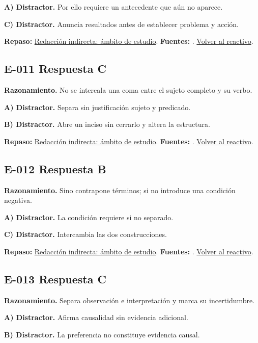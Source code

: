 \textbf{A) Distractor. }Por ello requiere un antecedente que aún no aparece.

\textbf{C) Distractor. }Anuncia resultados antes de establecer problema y acción.

\textbf{Repaso:} \hyperref[sec:e1]{Redacción indirecta: ámbito de estudio}. \textbf{Fuentes:} \cite{rae,writing}. \hyperref[q:E-010]{Volver al reactivo}.\par\medskip

\subsection*{E-011 \quad Respuesta C}\label{s:E-011}
\textbf{Razonamiento.} No se intercala una coma entre el sujeto completo y su verbo.

\textbf{A) Distractor. }Separa sin justificación sujeto y predicado.

\textbf{B) Distractor. }Abre un inciso sin cerrarlo y altera la estructura.

\textbf{Repaso:} \hyperref[sec:e1]{Redacción indirecta: ámbito de estudio}. \textbf{Fuentes:} \cite{rae,writing}. \hyperref[q:E-011]{Volver al reactivo}.\par\medskip

\subsection*{E-012 \quad Respuesta B}\label{s:E-012}
\textbf{Razonamiento.} Sino contrapone términos; si no introduce una condición negativa.

\textbf{A) Distractor. }La condición requiere si no separado.

\textbf{C) Distractor. }Intercambia las dos construcciones.

\textbf{Repaso:} \hyperref[sec:e1]{Redacción indirecta: ámbito de estudio}. \textbf{Fuentes:} \cite{rae,writing}. \hyperref[q:E-012]{Volver al reactivo}.\par\medskip

\subsection*{E-013 \quad Respuesta C}\label{s:E-013}
\textbf{Razonamiento.} Separa observación e interpretación y marca su incertidumbre.

\textbf{A) Distractor. }Afirma causalidad sin evidencia adicional.

\textbf{B) Distractor. }La preferencia no constituye evidencia causal.

